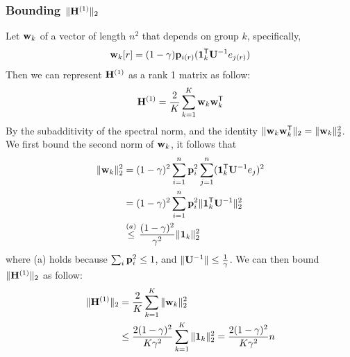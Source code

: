 \subsubsection{Bounding $\|\mathbf{{H}}^{(1)}\|_2$}
Let $\mathbf{{w}}_k$ of a vector of length $n^2$ that depends on group $k$, specifically,  
\begin{equation*}
    \mathbf{{w}}_k[r] = (1 - \gamma) \mathbf{{p}}_{i(r)} (\mathbf{{1}}_{k}^{\mathsf{T}} \mathbf{{U}}^{-1} e_{j(r)})
\end{equation*}
Then we can represent $\mathbf{{H}}^{(1)}$ as a rank 1 matrix as follow:
\begin{equation*}
    \mathbf{{H}}^{(1)} = \frac{2}{K}\sum_{k=1}^{K} \mathbf{{w}}_k \mathbf{{w}}_k^{\mathsf{T}}
\end{equation*}
By the subadditivity of the spectral norm, and the identity $\|\mathbf{{w}}_k \mathbf{{w}}_k^{\mathsf{T}}\|_2 = \|\mathbf{{w}}_k\|_2^2$. We first bound the second norm of $\mathbf{{w}}_k$,  it follows that
\begin{align*}
    \|\mathbf{{w}}_k\|_2^2 &= {(1-\gamma)^2} \sum_{i=1}^{n}\mathbf{{p}}_{i}^2  \sum_{j=1}^{n} (\mathbf{{1}}_{k}^{\mathsf{T}} \mathbf{{U}}^{-1} e_j)^2\\
    & ={(1-\gamma)^2} \sum_{i=1}^{n}\mathbf{{p}}_{i}^2  \|\mathbf{{1}}_{k}^{\mathsf{T}} \mathbf{{U}}^{-1} \|_2^2 \\
    & \stackrel{(a)}{\leq}  \frac{(1-\gamma)^2}{\gamma^2} \|\mathbf{{1}}_{k}\|_2^2
\end{align*}
where (a) holds because $\sum_i \mathbf{{p}}_i^2 \leq 1$, and $\|\mathbf{{U}}^{-1}\| \leq \frac{1}{\gamma}$.
We can then bound $\|\mathbf{{H}}^{(1)}\|_2$ as follow:
\begin{align}
	\label{eq:boundh1}
	\|\mathbf{{H}}^{(1)}\|_2 &= \frac{2}{K}\sum_{k=1}^{K}\|\mathbf{{w}}_k\|_2^2 \\
	& \leq \frac{2 (1 -\gamma)^2}{K \gamma^2} \sum_{k=1}^{K} \|\mathbf{{1}}_{k}\|_2^2 = \frac{2 (1 -\gamma)^2}{K \gamma^2} n
\end{align}



